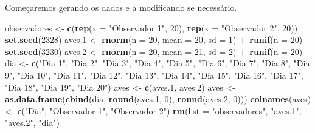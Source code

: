 \documentclass[]{book}
\newenvironment{Shaded}{\begin{snugshade}}{\end{snugshade}}
\newcommand{\DataTypeTok}[1]{\textcolor[rgb]{0.13,0.29,0.53}{#1}}
\newcommand{\DecValTok}[1]{\textcolor[rgb]{0.00,0.00,0.81}{#1}}
\newcommand{\FloatTok}[1]{\textcolor[rgb]{0.00,0.00,0.81}{#1}}
\newcommand{\KeywordTok}[1]{\textcolor[rgb]{0.13,0.29,0.53}{\textbf{#1}}}
\newcommand{\NormalTok}[1]{#1}
\newcommand{\OperatorTok}[1]{\textcolor[rgb]{0.81,0.36,0.00}{\textbf{#1}}}
\newcommand{\StringTok}[1]{\textcolor[rgb]{0.31,0.60,0.02}{#1}}
\begin{document}
Começaremos gerando os dados e a modificando se necessário.

\begin{Shaded}
\begin{Highlighting}[]
\NormalTok{observadores <-}\StringTok{ }\KeywordTok{c}\NormalTok{(}\KeywordTok{rep}\NormalTok{(}\DataTypeTok{x =} \StringTok{"Observador 1"}\NormalTok{, }\DecValTok{20}\NormalTok{), }\KeywordTok{rep}\NormalTok{(}\DataTypeTok{x =} \StringTok{"Observador 2"}\NormalTok{, }\DecValTok{20}\NormalTok{))}
\KeywordTok{set.seed}\NormalTok{(}\DecValTok{2328}\NormalTok{)}
\NormalTok{aves}\FloatTok{.1}\NormalTok{ <-}\StringTok{ }\KeywordTok{rnorm}\NormalTok{(}\DataTypeTok{n =} \DecValTok{20}\NormalTok{, }\DataTypeTok{mean =} \DecValTok{20}\NormalTok{, }\DataTypeTok{sd =} \DecValTok{1}\NormalTok{) }\OperatorTok{+}\StringTok{ }\KeywordTok{runif}\NormalTok{(}\DataTypeTok{n =} \DecValTok{20}\NormalTok{)}
\KeywordTok{set.seed}\NormalTok{(}\DecValTok{3230}\NormalTok{)}
\NormalTok{aves}\FloatTok{.2}\NormalTok{ <-}\StringTok{ }\KeywordTok{rnorm}\NormalTok{(}\DataTypeTok{n =} \DecValTok{20}\NormalTok{, }\DataTypeTok{mean =} \DecValTok{21}\NormalTok{, }\DataTypeTok{sd =} \DecValTok{2}\NormalTok{) }\OperatorTok{+}\StringTok{ }\KeywordTok{runif}\NormalTok{(}\DataTypeTok{n =} \DecValTok{20}\NormalTok{)}
\NormalTok{dia <-}\StringTok{ }\KeywordTok{c}\NormalTok{(}\StringTok{"Dia 1"}\NormalTok{, }\StringTok{"Dia 2"}\NormalTok{, }\StringTok{"Dia 3"}\NormalTok{, }\StringTok{"Dia 4"}\NormalTok{, }\StringTok{"Dia 5"}\NormalTok{, }\StringTok{"Dia 6"}\NormalTok{, }\StringTok{"Dia 7"}\NormalTok{, }\StringTok{"Dia 8"}\NormalTok{, }\StringTok{"Dia 9"}\NormalTok{, }\StringTok{"Dia 10"}\NormalTok{, }\StringTok{"Dia 11"}\NormalTok{, }\StringTok{"Dia 12"}\NormalTok{, }\StringTok{"Dia 13"}\NormalTok{, }\StringTok{"Dia 14"}\NormalTok{, }\StringTok{"Dia 15"}\NormalTok{, }\StringTok{"Dia 16"}\NormalTok{, }\StringTok{"Dia 17"}\NormalTok{, }\StringTok{"Dia 18"}\NormalTok{, }\StringTok{"Dia 19"}\NormalTok{, }\StringTok{"Dia 20"}\NormalTok{)}
\NormalTok{aves <-}\StringTok{ }\KeywordTok{c}\NormalTok{(aves}\FloatTok{.1}\NormalTok{, aves}\FloatTok{.2}\NormalTok{)}
\NormalTok{aves <-}\StringTok{ }\KeywordTok{as.data.frame}\NormalTok{(}\KeywordTok{cbind}\NormalTok{(dia, }\KeywordTok{round}\NormalTok{(aves}\FloatTok{.1}\NormalTok{, }\DecValTok{0}\NormalTok{), }\KeywordTok{round}\NormalTok{(aves}\FloatTok{.2}\NormalTok{, }\DecValTok{0}\NormalTok{)))}
\KeywordTok{colnames}\NormalTok{(aves) <-}\StringTok{ }\KeywordTok{c}\NormalTok{(}\StringTok{"Dia"}\NormalTok{, }\StringTok{"Observador 1"}\NormalTok{, }\StringTok{"Observador 2"}\NormalTok{)}
\KeywordTok{rm}\NormalTok{(}\DataTypeTok{list =} \StringTok{"observadores"}\NormalTok{, }\StringTok{"aves.1"}\NormalTok{, }\StringTok{"aves.2"}\NormalTok{, }\StringTok{"dia"}\NormalTok{)}
\end{Highlighting}
\end{Shaded}
\end{document}
